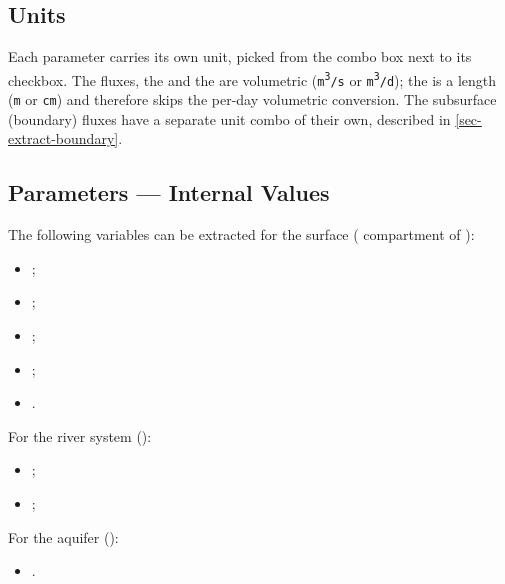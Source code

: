 \subsection{Units}
\label{sec-extract-units}
Each parameter carries its own unit, picked from the combo box next to its checkbox. The  fluxes, the   and the   are volumetric (\texttt{m\textsuperscript{3}/s} or \texttt{m\textsuperscript{3}/d}); the   is a length (\texttt{m} or \texttt{cm}) and therefore skips the per-day volumetric conversion. The  subsurface (boundary) fluxes have a separate unit combo of their own, described in \cref{sec-extract-boundary}.

\subsection{Parameters --- Internal Values}
\label{sec-extract-internal}
The following variables can be extracted for the surface ( compartment of \cawaqs):
\begin{itemize}
    \item {};
    \item {};
    \item {};
    \item {};
    \item {}.
\end{itemize}
For the river system ():
\begin{itemize}
    \item {};
    \item {};
\end{itemize}
For the aquifer ():
\begin{itemize}
    \item {}.
\end{itemize}

